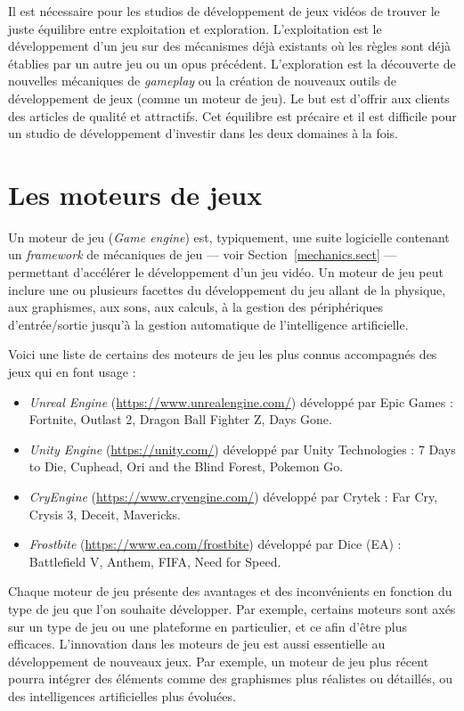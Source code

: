 Il est nécessaire pour les studios de développement de jeux vidéos de trouver le juste équilibre entre exploitation et exploration.
L'exploitation est le développement d'un jeu sur des mécanismes déjà existants où les règles sont déjà établies par un autre jeu ou un opus précédent.
L'exploration est la découverte de nouvelles mécaniques de \emph{gameplay} ou la création de nouveaux outils de développement de jeux (comme un moteur de jeu).
Le but est d'offrir aux clients des articles de qualité et attractifs.
Cet équilibre est précaire et il est difficile pour un studio de développement d'investir dans les deux domaines à la fois. 



\section{Les moteurs de jeux}
Un moteur de jeu (\emph{Game engine}) est, typiquement, une suite logicielle contenant un \emph{framework} de mécaniques de jeu --- voir Section~\ref{mechanics.sect} --- permettant d'accélérer le développement d'un jeu vidéo.
Un moteur de jeu peut inclure une ou plusieurs facettes du développement du jeu allant de la physique, aux graphismes, aux sons, aux calculs, à la gestion des périphériques d'entrée/sortie jusqu'à la gestion automatique de l'intelligence artificielle.

Voici une liste de certains des moteurs de jeu les plus connus accompagnés des jeux qui en font usage : 
\begin{itemize}
    \item \emph{Unreal Engine} (\url{https://www.unrealengine.com/}) développé par Epic Games : Fortnite, Outlast 2, Dragon Ball Fighter Z, Days Gone.
    \item \emph{Unity Engine} (\url{https://unity.com/}) développé par Unity Technologies : 7 Days to Die, Cuphead, Ori and the Blind Forest, Pokemon Go.
    \item \emph{CryEngine} (\url{https://www.cryengine.com/}) développé par Crytek : Far Cry, Crysis 3, Deceit, Mavericks.
    \item \emph{Frostbite} (\url{https://www.ea.com/frostbite}) développé par Dice (EA) : Battlefield V, Anthem, FIFA, Need for Speed.
\end{itemize}

Chaque moteur de jeu présente des avantages et des inconvénients en fonction du type de jeu que l'on souhaite développer.
Par exemple, certains moteurs sont axés sur un type de jeu ou une plateforme en particulier, et ce afin d'être plus efficaces. 
L'innovation dans les moteurs de jeu est aussi essentielle au développement de nouveaux jeux. 
Par exemple, un moteur de jeu plus récent pourra intégrer des éléments comme des graphismes plus réalistes ou détaillés, ou des intelligences artificielles plus évoluées.


